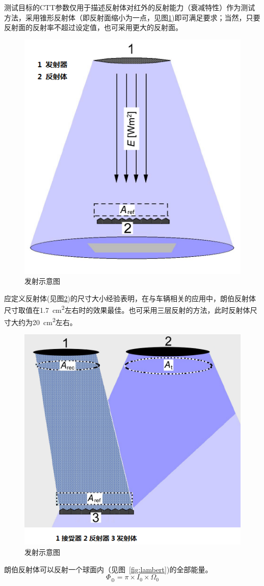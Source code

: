 \documentclass[is,copyright,is]{isov2}
\begin{document}
测试目标的CTT参数仅用于描述反射体对红外的反射能力（衰减特性）作为测试方法，采用锥形反射体（即反射面缩小为一点，见图\ref{fig:transmitter})即可满足要求；当然，只要反射面的反射率不超过设定值，也可采用更大的反射面。
\begin{figure}
	\centering
	\includegraphics[width=0.5\linewidth]{figures/transmitter}
	\caption{发射示意图}
	\label{fig:transmitter}
\end{figure}
应定义反射体(见图\ref{fig:reflector})的尺寸大小经验表明，在与车辆相关的应用中，朗伯反射体尺寸取值在\SI{1.7}{cm^2}左右时的效果最佳。也可采用三层反射的方法，此时反射体尺寸大约为\SI{20}{cm^2}左右。
\begin{figure}[htbp]
	\centering
	\includegraphics[width=0.5\linewidth]{figures/reflector}
	\caption{发射示意图}
	\label{fig:reflector}
\end{figure}
朗伯反射体可以反射一个球面内（见图~\ref{fig:lambert})的全部能量。
\[\Phi_\oplus = \pi \times I_0\times \varOmega_0\]
\end{document}
